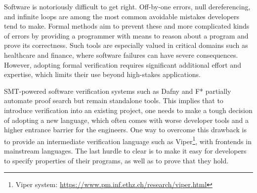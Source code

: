 

Software is notoriously difficult to get right. 
Off-by-one errors, null dereferencing, and infinite loops are among the most common avoidable mistakes developers tend to make. 
Formal methods aim to prevent these and more complicated kinds of errors by providing a programmer with means to reason about a program and prove its correctness.  
Such tools are especially valued in critical domains such as healthcare and finance, where software failures can have severe consequences. 
However, adopting formal verification requires significant additional effort and expertise, which limits their use beyond high-stakes applications.





SMT-powered software verification systems such as Dafny and F* partially automate proof search but remain standalone tools. 
This implies that to introduce verification into an existing project, one needs to make a tough decision of adopting a new language, which often comes with worse developer tools and a higher entrance barrier for the engineers. 
One way to overcome this drawback is to provide an intermediate verification language such as Viper\footnote{Viper system: \url{https://www.pm.inf.ethz.ch/research/viper.html}}, with frontends in mainstream languages.
The last hurdle to clear is to make it easy for developers to specify properties of their programs, as well as to prove that they hold. 

